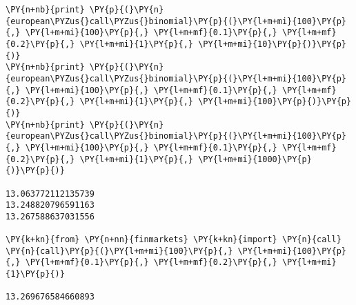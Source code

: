 \begin{codebox}
\begin{Verbatim}[commandchars=\\\{\}]
\PY{n+nb}{print} \PY{p}{(}\PY{n}{european\PYZus{}call\PYZus{}binomial}\PY{p}{(}\PY{l+m+mi}{100}\PY{p}{,} \PY{l+m+mi}{100}\PY{p}{,} \PY{l+m+mf}{0.1}\PY{p}{,} \PY{l+m+mf}{0.2}\PY{p}{,} \PY{l+m+mi}{1}\PY{p}{,} \PY{l+m+mi}{10}\PY{p}{)}\PY{p}{)}
\PY{n+nb}{print} \PY{p}{(}\PY{n}{european\PYZus{}call\PYZus{}binomial}\PY{p}{(}\PY{l+m+mi}{100}\PY{p}{,} \PY{l+m+mi}{100}\PY{p}{,} \PY{l+m+mf}{0.1}\PY{p}{,} \PY{l+m+mf}{0.2}\PY{p}{,} \PY{l+m+mi}{1}\PY{p}{,} \PY{l+m+mi}{100}\PY{p}{)}\PY{p}{)}
\PY{n+nb}{print} \PY{p}{(}\PY{n}{european\PYZus{}call\PYZus{}binomial}\PY{p}{(}\PY{l+m+mi}{100}\PY{p}{,} \PY{l+m+mi}{100}\PY{p}{,} \PY{l+m+mf}{0.1}\PY{p}{,} \PY{l+m+mf}{0.2}\PY{p}{,} \PY{l+m+mi}{1}\PY{p}{,} \PY{l+m+mi}{1000}\PY{p}{)}\PY{p}{)}

13.063772112135739
13.248820796591163
13.267588637031556

\PY{k+kn}{from} \PY{n+nn}{finmarkets} \PY{k+kn}{import} \PY{n}{call}
\PY{n}{call}\PY{p}{(}\PY{l+m+mi}{100}\PY{p}{,} \PY{l+m+mi}{100}\PY{p}{,} \PY{l+m+mf}{0.1}\PY{p}{,} \PY{l+m+mf}{0.2}\PY{p}{,} \PY{l+m+mi}{1}\PY{p}{)}

13.269676584660893
\end{Verbatim}
\end{codebox}